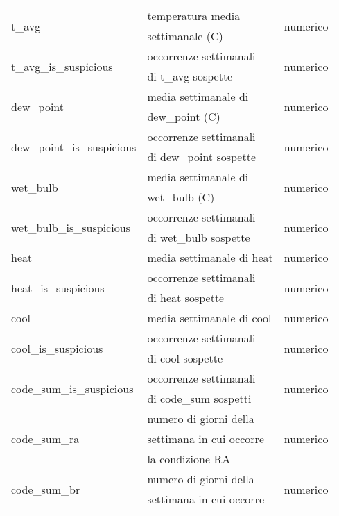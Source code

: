 \begin{longtable}{lll}
	\multirow{2}{*}{t\_avg}		& temperatura media  	  & 
	\multirow{2}{*}{numerico}	\\ 
	& settimanale (\degree C) &	\\\hline
	\multirow{2}{*}{t\_avg\_is\_suspicious}	& occorrenze settimanali & 
	\multirow{2}{*}{numerico}	\\ 
	& di t\_avg sospette & \\	\hline		
	\multirow{2}{*}{dew\_point}	& media settimanale di  	 & 	
	\multirow{2}{*}{numerico}	   	\\ 
	& dew\_point (\degree C) &		\\ \hline
	\multirow{2}{*}{dew\_point\_is\_suspicious}		& occorrenze settimanali & 
	\multirow{2}{*}{numerico}	\\
	& di dew\_point sospette &  \\	\hline
	\multirow{2}{*}{wet\_bulb}	& media settimanale di & 	
	\multirow{2}{*}{numerico}	   	\\ 
	& wet\_bulb (\degree C)&\\ \hline
	\multirow{2}{*}{wet\_bulb\_is\_suspicious}		& occorrenze settimanali & 
	\multirow{2}{*}{numerico}	\\ 
	& di wet\_bulb sospette & \\	\hline
	heat	& media settimanale di heat & 	numerico \\	\hline
	\multirow{2}{*}{heat\_is\_suspicious} & occorrenze settimanali & 
	\multirow{2}{*}{numerico}	\\
	& di heat sospette &	\\	\hline		
	cool	& media settimanale di cool & numerico \\	\hline
	\multirow{2}{*}{cool\_is\_suspicious}		& occorrenze settimanali & 
	\multirow{2}{*}{numerico}	\\
	& di cool sospette & \\	\hline		 
	\multirow{2}{*}{code\_sum\_is\_suspicious}	& occorrenze settimanali & 
	\multirow{2}{*}{numerico}	\\
	& di code\_sum sospetti & 	 \\\hline	
	\multirow{3}{*}{code\_sum\_ra}	& numero di giorni della 	& 	 
	\multirow{3}{*}{numerico} \\
	& settimana in cui occorre & \\ 
	& la condizione RA & \\ \hline
	\multirow{3}{*}{code\_sum\_br}	& numero di giorni della	 & 	 
	\multirow{3}{*}{numerico} \\
	& settimana in cui occorre & \\ 

\end{longtable}
